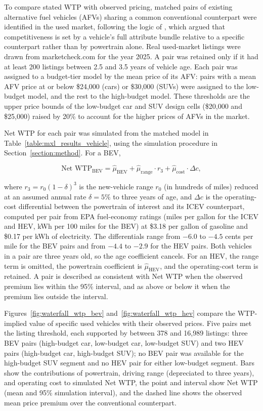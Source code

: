\documentclass[a4paper,fleqn]{cas-sc}   %
\begin{document}
To compare stated WTP with observed pricing, matched pairs of existing alternative fuel vehicles (AFVs) sharing a common conventional counterpart were identified in the used market, following the logic of \textcite{helveston2014ChinaUSPreferences}, which argued that competitiveness is set by a vehicle's full attribute bundle relative to a specific counterpart rather than by powertrain alone. Real used-market listings were drawn from marketcheck.com for the year 2025. A pair was retained only if it had at least 200 listings between 2.5 and 3.5 years of vehicle age. Each pair was assigned to a budget-tier model by the mean price of its AFV: pairs with a mean AFV price at or below \$24,000 (cars) or \$30,000 (SUVs) were assigned to the low-budget model, and the rest to the high-budget model. These thresholds are the upper price bounds of the low-budget car and SUV design cells (\$20,000 and \$25,000) raised by 20\% to account for the higher prices of AFVs in the market.

Net WTP for each pair was simulated from the matched model in Table~\ref{table:mxl_results_vehicle}, using the simulation procedure in Section~\ref{section:method}. For a BEV,

\begin{equation}
\text{Net WTP}_{\text{BEV}} = \hat{\mu}_{\mathrm{BEV}} + \hat{\mu}_{\mathrm{range}} \cdot r_3 + \hat{\mu}_{\mathrm{cost}} \cdot \Delta c,
\label{eq:net_wtp}
\end{equation}

\noindent where $r_3 = r_0(1-\delta)^3$ is the new-vehicle range $r_0$ (in hundreds of miles) reduced at an assumed annual rate $\delta = 5\%$ to three years of age, and $\Delta c$ is the operating-cost differential between the powertrain of interest and its ICEV counterpart, computed per pair from EPA fuel-economy ratings (miles per gallon for the ICEV and HEV, kWh per 100 miles for the BEV) at \$3.18 per gallon of gasoline and \$0.17 per kWh of electricity. The differentials range from $-6.0$ to $-4.5$ cents per mile for the BEV pairs and from $-4.4$ to $-2.9$ for the HEV pairs. Both vehicles in a pair are three years old, so the age coefficient cancels. For an HEV, the range term is omitted, the powertrain coefficient is $\hat{\mu}_{\mathrm{HEV}}$, and the operating-cost term is retained. A pair is described as consistent with Net WTP when the observed premium lies within the 95\% interval, and as above or below it when the premium lies outside the interval.

Figures~\ref{fig:waterfall_wtp_bev} and~\ref{fig:waterfall_wtp_hev} compare the WTP-implied value of specific used vehicles with their observed prices. Five pairs met the listing threshold, each supported by between 378 and 16,989 listings: three BEV pairs (high-budget car, low-budget car, low-budget SUV) and two HEV pairs (high-budget car, high-budget SUV); no BEV pair was available for the high-budget SUV segment and no HEV pair for either low-budget segment. Bars show the contributions of powertrain, driving range (depreciated to three years), and operating cost to simulated Net WTP, the point and interval show Net WTP (mean and 95\% simulation interval), and the dashed line shows the observed mean price premium over the conventional counterpart.
\end{document}
